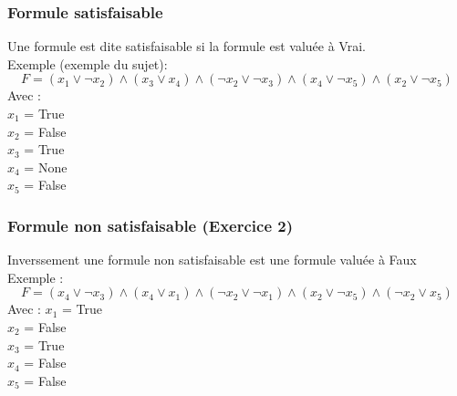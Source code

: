 \documentclass{article}
\begin{document}
    \subsubsection{Formule satisfaisable}
    Une formule est dite satisfaisable si la formule est valuée à Vrai. \\
    Exemple (exemple du sujet): \\
    \begin{equation*}
        F=(x_1 \lor \neg x_2) \wedge (x_3 \lor x_4) \wedge (\neg x_2 \lor \neg x_3) \wedge (x_4 \lor \neg x_5) \wedge (x_2 \lor \neg x_5)
    \end{equation*}
    Avec : \\
    $x_1$ = True \\
    $x_2$ = False \\
    $x_3$ = True \\
    $x_4$ = None \\ 
    $x_5$ = False \\
    \newpage
    \subsubsection{Formule non satisfaisable (Exercice 2)}
    Inverssement une formule non satisfaisable est une formule valuée à Faux
    Exemple : \\
    \begin{equation*}
        F=(x_4 \lor \neg x_3) \wedge (x_4 \lor x_1) \wedge (\neg x_2 \lor \neg x_1) \wedge (x_2 \lor \neg x_5) \wedge (\neg x_2 \lor x_5)
    \end{equation*}
    Avec :
    $x_1$ = True \\
    $x_2$ = False \\
    $x_3$ = True \\
    $x_4$ = False \\ 
    $x_5$ = False \\
\end{document}
